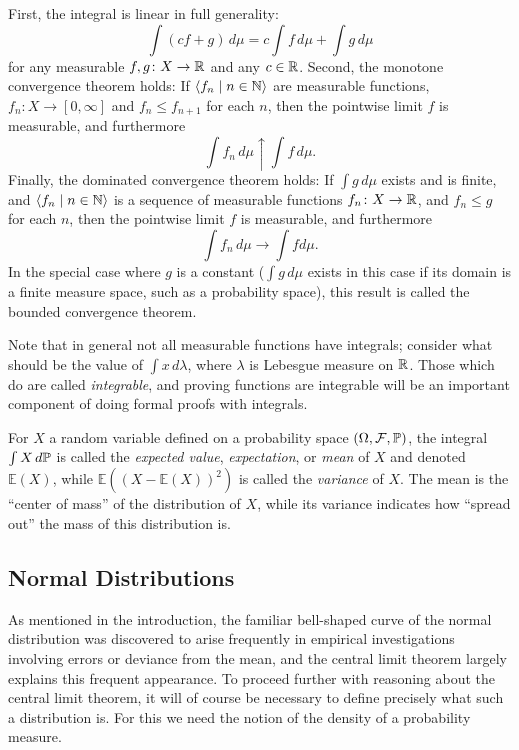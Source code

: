 \documentclass{article}
\theoremstyle{definition}
\newcommand{\bldseq}[2]{\langle{#1}\mid{#2}\rangle}
\renewcommand{\E}{\mathbb E}
\begin{document}
First, the integral is linear in full generality:
\[ \int (cf + g) \, d\mu = c\int f \, d\mu + \int g \, d\mu \]
for any measurable $f,g\colon X \rightarrow \R$ and any $c \in \R$. Second, the monotone convergence theorem holds: If $\bldseq{f_n}{n \in \N}$ are measurable functions, $f_n\colon X \rightarrow [0,\infty]$ and $f_n \le f_{n+1}$ for each $n$, then the pointwise limit $f$ is measurable, and furthermore
\[ \int f_n \, d\mu \uparrow \int f \, d\mu. \]
Finally, the dominated convergence theorem holds: If $\int g \, d\mu$ exists and is finite, and $\bldseq{f_n}{n \in \N}$ is a sequence of measurable functions $f_n\colon X \rightarrow \R$, and $f_n \le g$ for each $n$, then the pointwise limit $f$ is measurable, and furthermore
\[ \int f_n \, d\mu \rightarrow \int f d\mu. \]
In the special case where $g$ is a constant ($\int g \, d\mu$ exists in this case if its domain is a finite measure space, such as a probability space), this result is called the bounded convergence theorem.

Note that in general not all measurable functions have integrals; consider what should be the value of $\int x \, d\lambda$, where $\lambda$ is Lebesgue measure on $\R$. Those which do are called {\em integrable}, and proving functions are integrable will be an important component of doing formal proofs with integrals.

For $X$ a random variable defined on a probability space $(\Omega, \mathcal F, \P)$, the integral $\int X \, d\P$ is called the {\em expected value}, {\em expectation}, or {\em mean} of $X$ and denoted $\E(X)$, while $\E((X - \E(X))^2)$ is called the {\em variance} of $X$. The mean is the ``center of mass'' of the distribution of $X$, while its variance indicates how ``spread out'' the mass of this distribution is.

\subsection{Normal Distributions}

As mentioned in the introduction, the familiar bell-shaped curve of the normal distribution was discovered to arise frequently in empirical investigations involving errors or deviance from the mean, and the central limit theorem largely explains this frequent appearance. To proceed further with reasoning about the central limit theorem, it will of course be necessary to define precisely what such a distribution is. For this we need the notion of the density of a probability measure.
\end{document}
